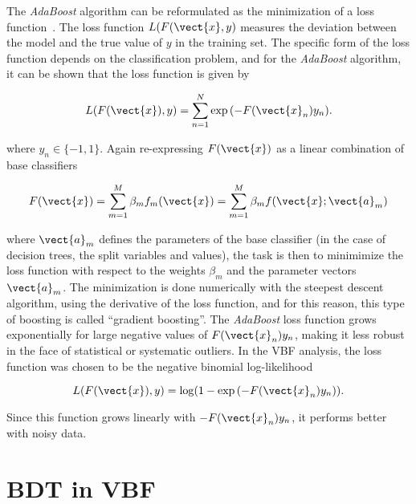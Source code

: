 
The \textit{AdaBoost} algorithm can be reformulated as the
minimization of a loss function~\cite{bib:friedman2000greedy}. The loss function
$L(F(\vect{x},y)$ measures the deviation between the model and the
true value of $y$ in the training set. The specific form of the loss
function depends on the classification problem, and for the \textit{AdaBoost}
algorithm, it can be shown that the loss function is given by

\begin{equation}
\label{chap:bdt:equation:adaboost_loss}
    L(F(\vect{x}),y) = \sum_{n=1}^{N}\exp{(-F(\vect{x}_n)y_n)}.
\end{equation}

\noindent where $y_n \in \{-1,1\}$. Again re-expressing $F(\vect{x})$
as a linear combination of base classifiers

\begin{equation}
\label{chap:bdt:equation:adaboost_loss}
    F(\vect{x}) = \sum_{m=1}^{M} \beta_m f_m(\vect{x}) =
    \sum_{m=1}^{M} \beta_m f(\vect{x};\vect{a}_m)
\end{equation}

\noindent where $\vect{a}_m$ defines the parameters of the base
classifier (in the case of decision trees, the split variables and
values), the task is then to minimimize the loss function with respect
to the weights $\beta_m$ and the parameter vectors $\vect{a}_m$. The
minimization is done numerically with the steepest descent algorithm,
using the derivative of the loss function, and for this reason, this
type of boosting is called ``gradient boosting''. The
\textit{AdaBoost} loss function grows exponentially for large negative
values of $F(\vect{x}_n)y_n$, making it less robust in the face of
statistical or systematic outliers. In the VBF analysis, the loss
function was chosen to be the negative binomial log-likelihood

\begin{equation}
\label{chap:bdt:equation:vbf_loss}
    L(F(\vect{x}),y) = \log (1-\exp{(-F(\vect{x}_n)y_n)}).
\end{equation}

\noindent Since this function grows linearly with $-F(\vect{x}_n)y_n$, it performs
better with noisy data. 

\section{BDT in VBF \hwwlnln}

